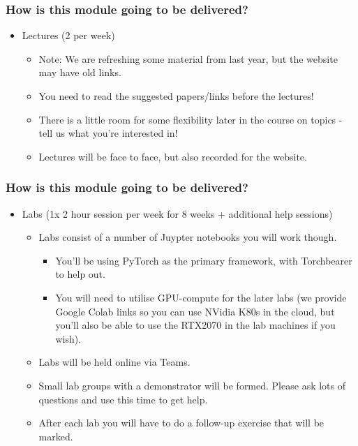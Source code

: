 \documentclass[\beamerclass]{beamer}
\begin{document}
\begin{frame}
	\frametitle{How is this module going to be delivered?}
	
	\begin{itemize}
		\item<+-> Lectures (2 per week)
		\begin{itemize}
			\item Note: We are refreshing some material from last year, but the website may have old links.
			\item You need to read the suggested papers/links before the lectures!
			\item There is a little room for some flexibility later in the course on topics - tell us what you're interested in!
			\item<+-> Lectures will be face to face, but also recorded for the website. 
			
		\end{itemize}
	\end{itemize}
\end{frame}

\begin{frame}
	\frametitle{How is this module going to be delivered?}

	\begin{itemize}
		\item<+-> Labs (1x 2 hour session per week for 8 weeks + additional help sessions)
		\begin{itemize}
			\item Labs consist of a number of Juypter notebooks you will work though.
			\begin{itemize}
				\item You'll be using PyTorch as the primary framework, with Torchbearer to help out.
				\item You will need to utilise GPU-compute for the later labs (we provide Google Colab links so you can use NVidia K80s in the cloud, but you'll also be able to use the RTX2070 in the lab machines if you wish).
			\end{itemize}
			\item Labs will be held online via Teams. 
			\item Small lab groups with a demonstrator will be formed. Please ask lots of questions and use this time to get help.
			\item After each lab you will have to do a follow-up exercise that will be marked.
		\end{itemize}
	\end{itemize}
\end{frame}
\end{document}
